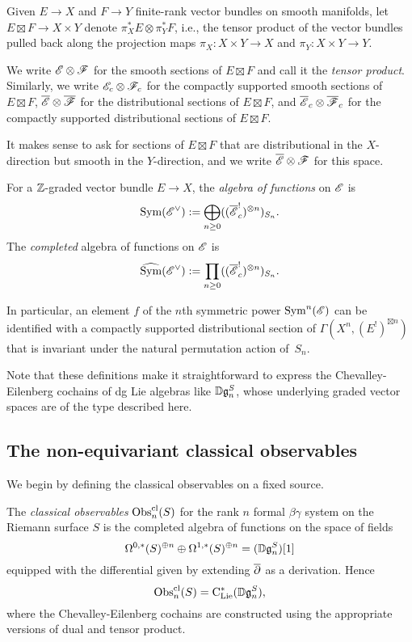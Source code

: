 Given $E \to X$ and $F \to Y$ finite-rank vector bundles on smooth manifolds,
let $E \boxtimes F \to X \times Y$ denote $\pi_X^*E \otimes \pi_Y^* F$,
i.e., the tensor product of the vector bundles pulled back along the projection maps 
$\pi_X: X \times Y \to X$ and $\pi_Y: X \times Y \to Y$.

\begin{dfn}
We write $\mathscr E \otimes \mathscr F$ for the smooth sections of $E \boxtimes F$ and call it the \emph{tensor product}.
Similarly, we write 
$\mathscr E_c \otimes \mathscr F_c$ for the compactly supported smooth sections of $E \boxtimes F$,
$\overline{\mathscr E} \otimes \overline{\mathscr F}$ for the distributional sections of $E \boxtimes F$, and
$\overline{\mathscr E}_c \otimes \overline{\mathscr F}_c$ for the compactly supported distributional sections of $E \boxtimes F$.
\end{dfn}

It makes sense to ask for sections of $E \boxtimes F$ that are distributional in the $X$-direction but smooth in the $Y$-direction,
and we write $\overline{\mathscr E} \otimes \mathscr F$ for this space.

\begin{dfn}
For a $\mathbb Z$-graded vector bundle $E \to X$, the {\em algebra of functions} on $\mathscr E$ is
\[
{\rm Sym}(\mathscr E^\vee) := \bigoplus_{n \geq 0} ((\overline{\mathscr E}_c^!)^{\otimes n})_{S_n}.
\]
The {\em completed} algebra of functions on $\mathscr E$ is
\[
\widehat{{\rm Sym}}(\mathscr E^\vee) := \prod_{n \geq 0} ((\overline{\mathscr E}_c^!)^{\otimes n})_{S_n}.
\]
\end{dfn}

In particular, an element $f$ of the $n$th symmetric power ${\rm Sym}^n(\mathscr E)$ 
can be identified with a compactly supported distributional section of $\Gamma(X^n, (E^!)^{\boxtimes n})$
that is invariant under the natural permutation action of~$S_n$.

Note that these definitions make it straightforward to express the Chevalley-Eilenberg cochains
of dg Lie algebras like $\mathbb D\mathfrak{g}_n^S$, whose underlying graded vector spaces are of the type described here.

\subsection{The non-equivariant classical observables}

We begin by defining the classical observables on a fixed source.

\begin{dfn}
The \emph{classical observables} ${\rm Obs}^{{\rm cl}}_n(S)$ 
for the rank $n$ formal $\beta\gamma$ system on the Riemann surface $S$ 
is the completed algebra of functions on the space of fields
\[
\Omega^{0,*}(S)^{\oplus n} \oplus \Omega^{1,*}(S)^{\oplus n} = (\mathbb D \mathfrak{g}_n^S)[1]
\]
equipped with the differential given by extending $\overline{\partial}$ as a derivation.
Hence
\[
{\rm Obs}^{{\rm cl}}_n(S) = {\rm C}_{\rm Lie}^*(\mathbb D \mathfrak{g}_n^S),
\]
where the Chevalley-Eilenberg cochains are constructed using the appropriate versions of dual and tensor product.
\end{dfn}


